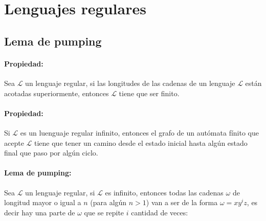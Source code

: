 \section{Lenguajes regulares}
\label{sec:pumping}
\subsection{Lema de pumping}
\label{subsec:pumping}
\paragraph{Propiedad:} Sea \(\mathcal{L}\) un lenguaje regular, si las longitudes de las cadenas de un lenguaje \(\mathcal{L}\) están acotadas superiormente, entonces \(\mathcal{L}\) tiene que ser finito.

\paragraph{Propiedad:} Si \(\mathcal{L}\) es un luenguaje regular infinito, entonces el grafo de un autómata fínito que acepte \(\mathcal{L}\) tiene que tener un camino desde el estado inicial hasta algún estado final que paso por algún ciclo.

\paragraph{Lema de pumping:} Sea \(\mathcal{L}\) un lenguaje regular, si \(\mathcal{L}\) es infinito, entonces todas las cadenas \(\omega\) de longitud mayor o igual a \(n\) (para algún \(n > 1\)) van a ser de la forma \(\omega=xy^iz\), es decir hay una parte de \(\omega\) que se repite \(i\) cantidad de veces:

